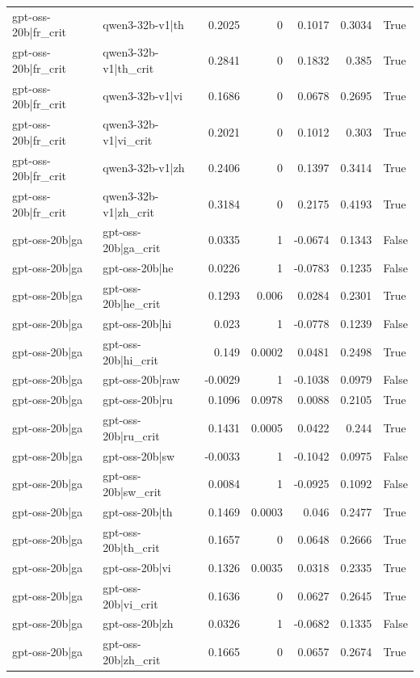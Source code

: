\begin{table}
\begin{tabular}{l l r r r r l}
gpt-oss-20b|fr_crit & qwen3-32b-v1|th & 0.2025 & 0 & 0.1017 & 0.3034 & True \\
gpt-oss-20b|fr_crit & qwen3-32b-v1|th_crit & 0.2841 & 0 & 0.1832 & 0.385 & True \\
gpt-oss-20b|fr_crit & qwen3-32b-v1|vi & 0.1686 & 0 & 0.0678 & 0.2695 & True \\
gpt-oss-20b|fr_crit & qwen3-32b-v1|vi_crit & 0.2021 & 0 & 0.1012 & 0.303 & True \\
gpt-oss-20b|fr_crit & qwen3-32b-v1|zh & 0.2406 & 0 & 0.1397 & 0.3414 & True \\
gpt-oss-20b|fr_crit & qwen3-32b-v1|zh_crit & 0.3184 & 0 & 0.2175 & 0.4193 & True \\
gpt-oss-20b|ga & gpt-oss-20b|ga_crit & 0.0335 & 1 & -0.0674 & 0.1343 & False \\
gpt-oss-20b|ga & gpt-oss-20b|he & 0.0226 & 1 & -0.0783 & 0.1235 & False \\
gpt-oss-20b|ga & gpt-oss-20b|he_crit & 0.1293 & 0.006 & 0.0284 & 0.2301 & True \\
gpt-oss-20b|ga & gpt-oss-20b|hi & 0.023 & 1 & -0.0778 & 0.1239 & False \\
gpt-oss-20b|ga & gpt-oss-20b|hi_crit & 0.149 & 0.0002 & 0.0481 & 0.2498 & True \\
gpt-oss-20b|ga & gpt-oss-20b|raw & -0.0029 & 1 & -0.1038 & 0.0979 & False \\
gpt-oss-20b|ga & gpt-oss-20b|ru & 0.1096 & 0.0978 & 0.0088 & 0.2105 & True \\
gpt-oss-20b|ga & gpt-oss-20b|ru_crit & 0.1431 & 0.0005 & 0.0422 & 0.244 & True \\
gpt-oss-20b|ga & gpt-oss-20b|sw & -0.0033 & 1 & -0.1042 & 0.0975 & False \\
gpt-oss-20b|ga & gpt-oss-20b|sw_crit & 0.0084 & 1 & -0.0925 & 0.1092 & False \\
gpt-oss-20b|ga & gpt-oss-20b|th & 0.1469 & 0.0003 & 0.046 & 0.2477 & True \\
gpt-oss-20b|ga & gpt-oss-20b|th_crit & 0.1657 & 0 & 0.0648 & 0.2666 & True \\
gpt-oss-20b|ga & gpt-oss-20b|vi & 0.1326 & 0.0035 & 0.0318 & 0.2335 & True \\
gpt-oss-20b|ga & gpt-oss-20b|vi_crit & 0.1636 & 0 & 0.0627 & 0.2645 & True \\
gpt-oss-20b|ga & gpt-oss-20b|zh & 0.0326 & 1 & -0.0682 & 0.1335 & False \\
gpt-oss-20b|ga & gpt-oss-20b|zh_crit & 0.1665 & 0 & 0.0657 & 0.2674 & True \\

\end{tabular}
\end{table}
